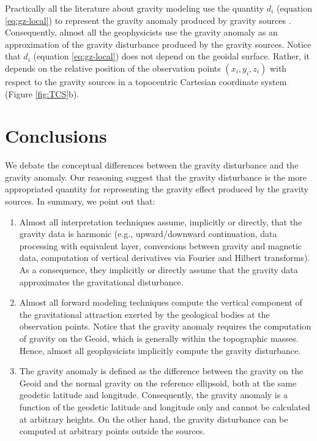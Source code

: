 \documentclass[extra]{gji}
\begin{document}
Practically all the literature about gravity modeling
use the quantity $d_{i}$ (equation \ref{eq:gz-local})
to represent the gravity anomaly produced by 
gravity sources \citep[e.g.,][]{blakely1996}. 
Consequently, almost all the geophysicists use the gravity
anomaly as an approximation of the gravity disturbance
produced by the gravity sources. Notice that $d_{i}$ 
(equation \ref{eq:gz-local}) does not depend on the
geoidal surface. Rather, it depends on the relative position 
of the observation points $(x_{i}, y_{i}, z_{i})$ with respect to
the gravity sources in a topocentric Cartesian coordinate
system (Figure \ref{fig:TCS}b).


\section{Conclusions}

We debate the conceptual differences between the gravity
disturbance and the gravity anomaly.
Our reasoning suggest that the gravity disturbance is the
more appropriated quantity for representing the gravity
effect produced by the gravity sources.
In summary, we point out that:

\begin{enumerate}
\renewcommand{\theenumii}{\alph{enumii}}

\item Almost all interpretation techniques assume, implicitly or
directly, that the gravity data is harmonic (e.g., 
upward/downward continuation, 
data processing with equivalent layer,
conversions between gravity and magnetic data,
computation of vertical derivatives via Fourier and Hilbert
transforms). As a consequence, they implicitly or directly assume that
the gravity data approximates the gravitational disturbance.

\item Almost all forward modeling techniques compute
the vertical component of the gravitational attraction 
exerted by the geological bodies at the observation points.
Notice that the gravity anomaly requires the computation of gravity
on the Geoid, which is generally within the topographic masses.
Hence, almost all geophysicists implicitly compute 
the gravity disturbance.

\item The gravity anomaly is defined as the difference between 
the gravity on the Geoid and the normal gravity on the reference 
ellipsoid, both at the same geodetic latitude and longitude.
Consequently, the gravity anomaly is a function of
the geodetic latitude and longitude only and cannot
be calculated at arbitrary heights. On the other hand,
the gravity disturbance can be computed at arbitrary points
outside the sources.

\end{enumerate}
\end{document}
